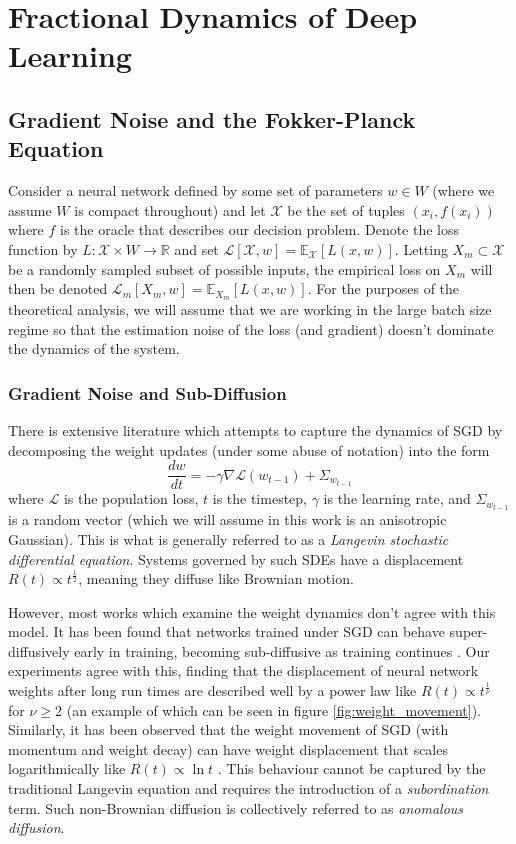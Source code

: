\documentclass{article} %
\theoremstyle{definition}
\begin{document}
\section{Fractional Dynamics of Deep Learning}\label{sec:fract_dynamic}
\subsection{Gradient Noise and the Fokker-Planck Equation}
Consider a neural network defined by some set of parameters $w \in W$ (where we assume $W$ is compact throughout) and let $\mathcal{X}$ be the set of tuples $(x_i, f(x_i))$ where $f$ is the oracle that describes our decision problem. Denote the loss function by $L: \mathcal{X} \times W \to \mathbb{R}$ and set $\mathcal{L}[\mathcal{X}, w] = \mathbb{E}_\mathcal{X}[L(x,w)]$. Letting $X_m \subset \mathcal{X}$ be a randomly sampled subset of possible inputs, the empirical loss on $X_m$ will then be denoted $\mathcal{L}_m[X_m, w] = \mathbb{E}_{X_m}[L(x,w)]$. For the purposes of the theoretical analysis, we will assume that we are working in the large batch size regime so that the estimation noise of the loss (and gradient) doesn't dominate the dynamics of the system.

\subsubsection{Gradient Noise and Sub-Diffusion}
There is extensive literature which attempts to capture the dynamics of SGD by decomposing the weight updates (under some abuse of notation) into the form
\begin{equation}
    \frac{d w}{dt} = -\gamma\nabla \mathcal{L}(w_{t-1}) + \Sigma_{w_{t-1}}
\end{equation}
where $\mathcal{L}$ is the population loss, $t$ is the timestep, $\gamma$ is the learning rate, and $\Sigma_{w_{t-1}}$ is a random vector (which we will assume in this work is an anisotropic Gaussian). This is what is generally referred to as a \textit{Langevin stochastic differential equation}. Systems governed by such SDEs have a displacement $R(t) \propto t^{\frac{1}{2}}$, meaning they diffuse like Brownian motion.

 However, most works which examine the weight dynamics don't agree with this model. It has been found that networks trained under SGD can behave super-diffusively early in training, becoming sub-diffusive as training continues \citep{chen2021anomalousdiffusiondynamicslearning}. Our experiments agree with this, finding that the displacement of neural network weights after long run times are described well by a power law like $R(t) \propto t^{\frac{1}{\nu}}$ for $\nu \geq 2$ \citep{BOUCHAUD1990127} (an example of which can be seen in figure \ref{fig:weight_movement}). Similarly, it has been observed that the weight movement of SGD (with momentum and weight decay) can have weight displacement that scales logarithmically like $R(t) \propto \ln t$ \citep{hoffer2018trainlongergeneralizebetter}. This behaviour cannot be captured by the traditional Langevin equation and requires the introduction of a \textit{subordination} term. Such non-Brownian diffusion is collectively referred to as \textit{anomalous diffusion}.
 
\end{document}
